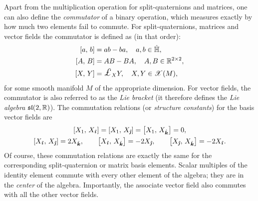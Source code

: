 Apart from the multiplication operation for split-quaternions and matrices, one can also define the \emph{commutator} of a binary operation, which measures exactly by how much two elements fail to commute. For split-quaternions, matrices and vector fields the commutator is defined as (in that order): 
\begin{equation}
    \begin{split}
        \liebr{a}{b} &= ab - ba,\quad a, b \in \spquaternions, \\
        \liebr{A}{B} &= AB - BA,\quad A, B \in \real^{2\times 2}, \\
        \liebr{X}{Y} &= \lied{X}{Y},\quad X,Y\in \vfields{M},
    \end{split}
\end{equation}
for some smooth manifold $M$ of the appropriate dimension. For vector fields, the commutator is also referred to as the \emph{Lie bracket} (it therefore defines the \emph{Lie algebra} $\mathfrak{sl}(2, \mathbb{R})$). The commutation relations (or \emph{structure constants}) for the basis vector fields are \cite{Schuller2014}
\begin{gather}
    \liebr{X_1}{X_{\quati}} = \liebr{X_1}{X_{\quatj}} = \liebr{X_1}{X_{\quatk}} = 0, \\
    \liebr{X_{\quati}}{X_{\quatj}} = 2X_{\quatk}, \qquad  
    \liebr{X_{\quati}}{X_{\quatk}} = -2X_{\quatj}, \qquad
    \liebr{X_{\quatj}}{X_{\quatk}} = -2X_{\quati}.
\end{gather}
Of course, these commutation relations are exactly the same for the corresponding split-quaternion or matrix basis elements. Scalar multiples of the identity element commute with every other element of the algebra; they are in the \emph{center} of the algebra. Importantly, the associate vector field also commutes with all the other vector fields. 

